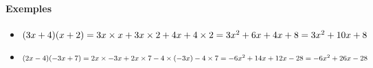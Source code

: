 \documentclass[
	a4paper,
	twocolumn=false,
	12pts,
	DIV=calc]%
	{article}
\begin{document}
\paragraph{Exemples}
\begin{itemize}
\item
\begin{math}
	(3x + 4)(x+2)\\
	= 3x\times x + 3x\times 2 + 4x + 4\times 2\\
	= 3x^2 + 6x + 4x + 8\\
	= 3x^2 + 10x + 8
\end{math}
\item
\begin{math}
	(2x-4)(-3x+7)\\
	= 2x \times -3x + 2x \times 7 -4 \times (-3x) -4\times 7\\
	= -6x^2 + 14x + 12x -28\\
	=-6x^2 + 26x - 28
\end{math}
\end{itemize}
\end{document}
